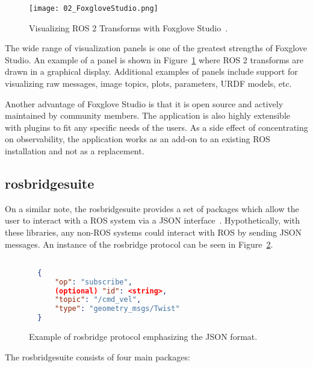         \begin{figure}[htbp]
            \centering
            \texttt{[image: 02\_FoxgloveStudio.png]}
            \caption{Visualizing ROS 2 Transforms with Foxglove Studio~\cite{transforms}.}
            \label{fig:foxglove}
        \end{figure}

        The wide range of visualization panels is one of the greatest strengths of Foxglove Studio. An example of a panel is shown in Figure~\ref{fig:foxglove} where \ac{ROS} 2 transforms are drawn in a graphical display. Additional examples of panels include support for visualizing raw messages, image topics, plots, parameters, \ac{URDF} models, etc.

        Another advantage of Foxglove Studio is that it is open source and actively maintained by community members. The application is also highly extensible with plugins to fit any specific needs of the users. As a side effect of concentrating on observability, the application works as an add-on to an existing ROS installation and not as a replacement.

    \subsection{rosbridge\smallunderscore  suite}

        On a similar note, the \textsf{rosbridge\smallunderscore  suite} provides a set of packages which allow the user to interact with a \ac{ROS} system via a \ac{JSON} interface~\cite{rosbridge}. Hypothetically, with these libraries, any non-ROS systems could interact with ROS by sending \ac{JSON} messages. An instance of the \textsf{rosbridge} protocol can be seen in Figure~\ref{fig:rosbridge}.

        \begin{figure}[htbp]
            \centering
            \begin{lstlisting}[language=JSON]

  {
      "op": "subscribe",
      (optional) "id": <string>,
      "topic": "/cmd_vel",
      "type": "geometry_msgs/Twist"
  }
            \end{lstlisting}
            \caption{Example of \textsf{rosbridge} protocol emphasizing the JSON format.}
            \label{fig:rosbridge}
        \end{figure}

        The \textsf{rosbridge\smallunderscore  suite} consists of four main packages:

